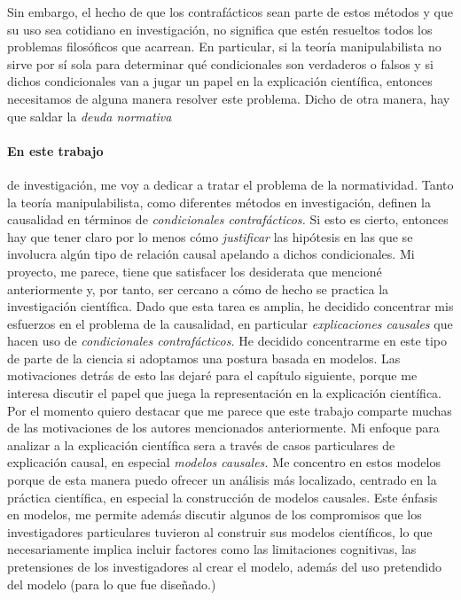 {{Sin embargo, el hecho de que los contrafácticos sean parte
de estos métodos y que su uso sea cotidiano en
investigación, no significa que estén resueltos todos los
problemas filosóficos que acarrean. En particular, si la
teoría manipulabilista no sirve por sí sola para determinar
qué condicionales son verdaderos o falsos y si dichos
condicionales van a jugar un papel en la explicación
científica, entonces necesitamos de alguna manera resolver
este problema. Dicho de otra manera, hay que saldar la
\emph{deuda normativa}



\paragraph{En este trabajo} de investigación, me voy a
dedicar a tratar el problema de la normatividad. Tanto la teoría manipulabilista, como diferentes métodos en
investigación, definen la causalidad en términos de
\emph{condicionales contrafácticos.} Si esto es cierto, entonces hay que tener
claro por lo menos cómo \emph{justificar} las hipótesis en
las que se involucra algún tipo de relación causal
apelando a dichos condicionales. Mi proyecto, me parece,
tiene que satisfacer los desiderata que mencioné
anteriormente y, por tanto, ser cercano a cómo de hecho se
practica la investigación científica. Dado que esta tarea es
amplia, he decidido concentrar mis esfuerzos en el
problema de la causalidad, en particular \emph{explicaciones
causales} que hacen uso de \emph{condicionales
contrafácticos.} He decidido concentrarme en este tipo de
parte de la ciencia si adoptamos una postura basada en
modelos. Las motivaciones detrás de esto las dejaré para el
capítulo siguiente, porque me interesa discutir el papel que
juega la representación en la explicación científica. Por el
momento quiero destacar que me parece que este trabajo
comparte muchas de las motivaciones de los autores
mencionados anteriormente. Mi enfoque para analizar a la
explicación científica sera a través de casos particulares
de explicación causal, en especial \emph{modelos causales.}
Me concentro en estos modelos porque de esta manera puedo
ofrecer un análisis más localizado, centrado en la práctica
científica, en especial la construcción de modelos
causales. Este énfasis en modelos, me permite además
discutir algunos de los compromisos que los investigadores
particulares tuvieron al construir sus modelos científicos,
lo que necesariamente implica incluir factores como las
limitaciones cognitivas, las pretensiones de los
investigadores al crear el modelo, además del uso
pretendido del modelo (para lo que fue diseñado.)

}}

